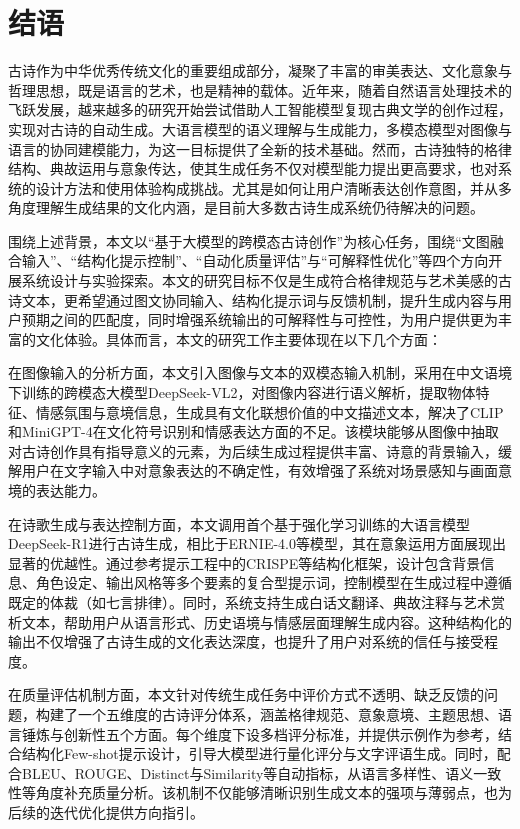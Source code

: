 
\chapter{结语}
古诗作为中华优秀传统文化的重要组成部分，凝聚了丰富的审美表达、文化意象与哲理思想，既是语言的艺术，也是精神的载体。近年来，随着自然语言处理技术的飞跃发展，越来越多的研究开始尝试借助人工智能模型复现古典文学的创作过程，实现对古诗的自动生成。大语言模型的语义理解与生成能力，多模态模型对图像与语言的协同建模能力，为这一目标提供了全新的技术基础。然而，古诗独特的格律结构、典故运用与意象传达，使其生成任务不仅对模型能力提出更高要求，也对系统的设计方法和使用体验构成挑战。尤其是如何让用户清晰表达创作意图，并从多角度理解生成结果的文化内涵，是目前大多数古诗生成系统仍待解决的问题。


围绕上述背景，本文以“基于大模型的跨模态古诗创作”为核心任务，围绕“文图融合输入”、“结构化提示控制”、“自动化质量评估”与“可解释性优化”等四个方向开展系统设计与实验探索。本文的研究目标不仅是生成符合格律规范与艺术美感的古诗文本，更希望通过图文协同输入、结构化提示词与反馈机制，提升生成内容与用户预期之间的匹配度，同时增强系统输出的可解释性与可控性，为用户提供更为丰富的文化体验。具体而言，本文的研究工作主要体现在以下几个方面：

在图像输入的分析方面，本文引入图像与文本的双模态输入机制，采用在中文语境下训练的跨模态大模型DeepSeek-VL2，对图像内容进行语义解析，提取物体特征、情感氛围与意境信息，生成具有文化联想价值的中文描述文本，解决了CLIP和MiniGPT-4在文化符号识别和情感表达方面的不足。该模块能够从图像中抽取对古诗创作具有指导意义的元素，为后续生成过程提供丰富、诗意的背景输入，缓解用户在文字输入中对意象表达的不确定性，有效增强了系统对场景感知与画面意境的表达能力。

在诗歌生成与表达控制方面，本文调用首个基于强化学习训练的大语言模型DeepSeek-R1进行古诗生成，相比于ERNIE-4.0等模型，其在意象运用方面展现出显著的优越性。通过参考提示工程中的CRISPE等结构化框架，设计包含背景信息、角色设定、输出风格等多个要素的复合型提示词，控制模型在生成过程中遵循既定的体裁（如七言排律）。同时，系统支持生成白话文翻译、典故注释与艺术赏析文本，帮助用户从语言形式、历史语境与情感层面理解生成内容。这种结构化的输出不仅增强了古诗生成的文化表达深度，也提升了用户对系统的信任与接受程度。

在质量评估机制方面，本文针对传统生成任务中评价方式不透明、缺乏反馈的问题，构建了一个五维度的古诗评分体系，涵盖格律规范、意象意境、主题思想、语言锤炼与创新性五个方面。每个维度下设多档评分标准，并提供示例作为参考，结合结构化Few-shot提示设计，引导大模型进行量化评分与文字评语生成。同时，配合BLEU、ROUGE、Distinct与Similarity等自动指标，从语言多样性、语义一致性等角度补充质量分析。该机制不仅能够清晰识别生成文本的强项与薄弱点，也为后续的迭代优化提供方向指引。


